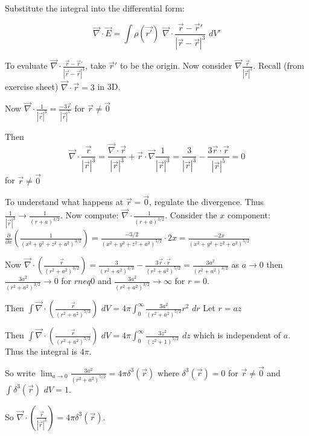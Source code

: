Substitute the integral into the differential form:

$$\vec{\nabla} \cdot \vec{E} = \int \rho (\vec{r'}) \, \, \vec{\nabla} \cdot \frac{\vec{r} - \vec{r}'}{|\vec{r} - \vec{r}|^3} \, \, dV'$$

To evaluate $\vec{\nabla} \cdot \frac{\vec{r} - \vec{r}'}{|\vec{r} - \vec{r}|^3}$, take $\vec{r}'$ to be the origin. Now consider $\vec{\nabla} \frac{\vec{r}}{|\vec{r}|^3}$. Recall (from exercise sheet) $\vec{\nabla} \cdot \vec{r} = 3$ in 3D.

Now $\vec{\nabla} \cdot \frac{1}{| \vec{r} |^3} = \frac{-3 \vec{r}}{|\vec{r}|^5}$ for $\vec{r} \neq \vec{0}$

Then $$\vec{\nabla} \cdot \frac{\vec{r}}{|\vec{r}|^3} = \frac{\vec{\nabla} \cdot \vec{r}}{|\vec{r}|^3} + \vec{r} \cdot \vec{\nabla} \frac{1}{|\vec{r}|^3} = \frac{3}{|\vec{r}|^3} - \frac{3 \vec{r} \cdot \vec{r}}{|\vec{r}|^5} = 0$$ for $\vec{r} \neq \vec{0}$

To understand what happens at $\vec{r} = \vec{0}$, regulate the divergence. Thus $\frac{1}{|\vec{r}|^3} \rightarrow \frac{1}{(r+a)^{3/2}}$. Now compute: $\vec{\nabla} \cdot \frac{1}{(r+a)^{3/2}}$. Consider the $x$ component: $\frac{\partial}{\partial x} \left(\frac{1}{(x^2 + y^2 + z^2 + a^2)^{3/2}}\right) = \frac{- 3/2}{(x^2 + y^2 + z^2 + a^2)^{5/2}} \cdot 2x = \frac{-2x}{(x^2 + y^2 + z^2 + a^2)^{5/2}}$

Now $\vec{\nabla} \cdot \left( \frac{\vec{r}}{(r^2 + a^2)^{3/2}}\right) = \frac{3}{(r^2 + a^2)^{3/2}} - \frac{3 \vec{r} \cdot \vec{r}}{(r^2 + a^2)^{5/2}} = \frac{3a^2}{(r^2 + a^2)^{3/2}}$ as $a \rightarrow 0$ then $\frac{3a^2}{(r^2 + a^2)^{3/2}} \rightarrow 0$ for $r neq 0$ and $\frac{3a^2}{(r^2 + a^2)^{3/2}} \rightarrow \infty$ for $r = 0$.

Then $\int \vec{\nabla} \cdot \left(\frac{\vec{r}}{(r^2 + a^2)^{5/2}}\right) \, \, dV = 4 \pi \int_0^{\infty} \frac{3a^2}{(r^2 + a^2)^{5/2}} r^2 \, \, dr$ Let $r = az$

Then $\int \vec{\nabla} \cdot \left(\frac{\vec{r}}{(r^2 + a^2)^{5/2}}\right) \, \, dV = 4 \pi \int_0^{\infty} \frac{3 z^2}{(z^2 + 1)^{5/2}} \, \, dz$ which is independent of $a$. Thus the integral is $4 \pi$.

So write $\lim_{a \rightarrow 0} \frac{3a^2}{(r^2 + a^2)^{5/2}} = 4 \pi \delta^3(\vec{r})$ where $\delta^3(\vec{r}) = 0$ for $\vec{r} \neq \vec{0}$ and $\int \delta^3 (\vec{r}) \, \, dV = 1$.

So $\vec{\nabla} \cdot \left(\frac{\vec{r}}{|\vec{r}|^3}\right) = 4 \pi \delta^3(\vec{r})$.

